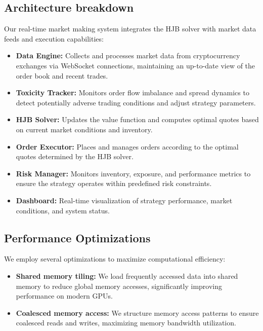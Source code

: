 \documentclass[onecolumn,ieee]{arithmaxresearch}
\begin{document}
\begin{onecolumn}
\subsection{Architecture breakdown}

Our real-time market making system integrates the HJB solver with market data feeds and execution capabilities:

\begin{itemize}
    \item \textbf{Data Engine:} Collects and processes market data from cryptocurrency exchanges via WebSocket connections, maintaining an up-to-date view of the order book and recent trades.
    
    \item \textbf{Toxicity Tracker:} Monitors order flow imbalance and spread dynamics to detect potentially adverse trading conditions and adjust strategy parameters.
    
    \item \textbf{HJB Solver:} Updates the value function and computes optimal quotes based on current market conditions and inventory.
    
    \item \textbf{Order Executor:} Places and manages orders according to the optimal quotes determined by the HJB solver.
    
    \item \textbf{Risk Manager:} Monitors inventory, exposure, and performance metrics to ensure the strategy operates within predefined risk constraints.
    
    \item \textbf{Dashboard:} Real-time visualization of strategy performance, market conditions, and system status.
\end{itemize}

\subsection{Performance Optimizations}

We employ several optimizations to maximize computational efficiency:

\begin{itemize}
    \item \textbf{Shared memory tiling:} We load frequently accessed data into shared memory to reduce global memory accesses, significantly improving performance on modern GPUs.
    
    \item \textbf{Coalesced memory access:} We structure memory access patterns to ensure coalesced reads and writes, maximizing memory bandwidth utilization.
    

\end{itemize}
\end{onecolumn}
\end{document}
